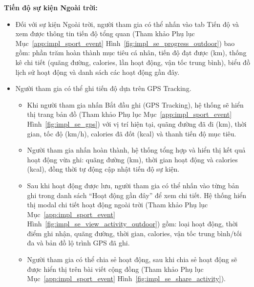 \textbf{Tiến độ sự kiện Ngoài trời:}
\begin{itemize}
    \item Đối với sự kiện Ngoài trời, người tham gia có thể nhấn vào tab Tiến độ và xem được thông tin tiến độ tổng quan (Tham khảo Phụ lục Mục~\ref{app:impl_sport_event} Hình~\ref{fig:impl_se_progress_outdoor}) bao gồm: phần trăm hoàn thành mục tiêu cá nhân, tiến độ đạt được (km), thống kê chi tiết (quãng đường, calories, lần hoạt động, vận tốc trung bình), biểu đồ lịch sử hoạt động và danh sách các hoạt động gần đây.


    \item Người tham gia có thể ghi tiến độ dựa trên GPS Tracking.
    \begin{itemize}
        \item Khi người tham gia nhấn Bắt đầu ghi (GPS Tracking), hệ thống sẽ hiển thị trang bản đồ (Tham khảo Phụ lục Mục~\ref{app:impl_sport_event} Hình~\ref{fig:impl_se_gps}) với vị trí hiện tại, quãng đường đã đi (km), thời gian, tốc độ (km/h), calories đã đốt (kcal) và thanh tiến độ mục tiêu.


        \item Người tham gia nhấn hoàn thành, hệ thống tổng hợp và hiển thị kết quả hoạt động vừa ghi: quãng đường (km), thời gian hoạt động và calories (kcal), đồng thời tự động cập nhật tiến độ sự kiện.


        \item Sau khi hoạt động được lưu, người tham gia có thể nhấn vào từng bản ghi trong danh sách ``Hoạt động gần đây'' để xem chi tiết. Hệ thống hiển thị modal chi tiết hoạt động ngoài trời (Tham khảo Phụ lục Mục~\ref{app:impl_sport_event} Hình~\ref{fig:impl_se_view_activity_outdoor}) gồm: loại hoạt động, thời điểm ghi nhận, quãng đường, thời gian, calories, vận tốc trung bình/tối đa và bản đồ lộ trình GPS đã ghi.


        \item Người tham gia có thể chia sẻ hoạt động, sau khi chia sẻ hoạt động sẽ được hiển thị trên bài viết cộng đồng (Tham khảo Phụ lục Mục~\ref{app:impl_sport_event} Hình~\ref{fig:impl_se_share_activity}).


    \end{itemize}
\end{itemize}

